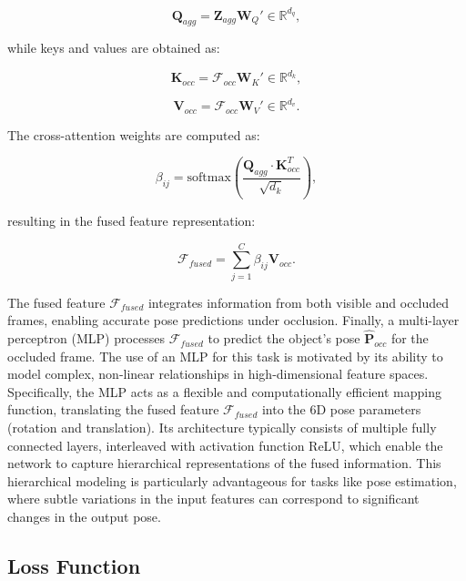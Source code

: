 \begin{equation}
\mathbf{Q}_{agg} = \mathbf{Z}_{agg} \mathbf{W}_Q' \in \mathbb{R}^{d_q},
\end{equation}

\noindent while keys and values are obtained as:

\begin{equation}
\mathbf{K}_{occ} = \mathcal{F}_{occ} \mathbf{W}_K' \in \mathbb{R}^{d_k},
\end{equation}

\begin{equation}
\mathbf{V}_{occ} = \mathcal{F}_{occ} \mathbf{W}_V' \in \mathbb{R}^{d_v}.
\end{equation}

\noindent The cross-attention weights are computed as:

\begin{equation}
\beta_{ij} = \text{softmax}\left(\frac{\mathbf{Q}_{agg} \cdot \mathbf{K}_{occ}^T}{\sqrt{d_k}}\right),
\end{equation}

\noindent resulting in the fused feature representation:

\begin{equation}
\mathcal{F}_{fused} = \sum_{j=1}^{C} \beta_{ij} \mathbf{V}_{occ}.
\end{equation}

\noindent The fused feature $\mathcal{F}_{fused}$ integrates information from both visible and occluded frames, enabling accurate pose predictions under occlusion. Finally, a multi-layer perceptron (MLP) processes $\mathcal{F}_{fused}$ to predict the object's pose $\hat{\mathbf{P}}_{occ}$ for the occluded frame. The use of an MLP for this task is motivated by its ability to model complex, non-linear relationships in high-dimensional feature spaces. Specifically, the MLP acts as a flexible and computationally efficient mapping function, translating the fused feature $\mathcal{F}_{fused}$ into the 6D pose parameters (rotation and translation). Its architecture typically consists of multiple fully connected layers, interleaved with activation function ReLU, which enable the network to capture hierarchical representations of the fused information. This hierarchical modeling is particularly advantageous for tasks like pose estimation, where subtle variations in the input features can correspond to significant changes in the output pose.

\subsection{Loss Function}

